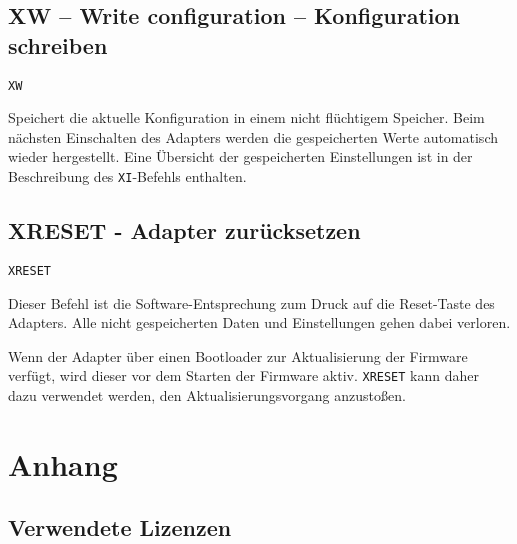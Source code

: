\documentclass[10pt,a4paper]{scrartcl}		%
\begin{document}
\subsection{XW -- Write configuration -- Konfiguration schreiben}

\texttt{XW}

Speichert die aktuelle Konfiguration in einem nicht flüchtigem Speicher.
Beim nächsten Einschalten des Adapters werden die gespeicherten Werte
automatisch wieder hergestellt. Eine Übersicht der gespeicherten
Einstellungen ist in der Beschreibung des \texttt{XI}-Befehls enthalten.

\subsection{XRESET - Adapter zurücksetzen}

\texttt{XRESET}

Dieser Befehl ist die Software-Entsprechung zum Druck auf die Reset-Taste
des Adapters. Alle nicht gespeicherten Daten und Einstellungen gehen
dabei verloren.

Wenn der Adapter über einen Bootloader zur Aktualisierung der Firmware
verfügt, wird dieser vor dem Starten der Firmware aktiv. \texttt{XRESET}
kann daher dazu verwendet werden, den Aktualisierungsvorgang anzustoßen.

\section{Anhang}
\subsection{Verwendete Lizenzen}



\renewcommand{\indexname}{Stichwortverzeichnis}
\printindex
\end{document}
